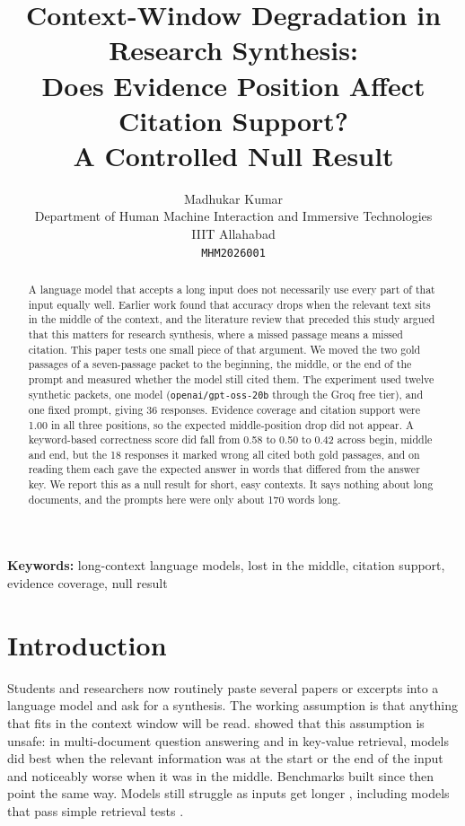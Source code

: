 \documentclass[11pt,a4paper]{article}
\title{Context-Window Degradation in Research Synthesis:\\
Does Evidence Position Affect Citation Support?\\
A Controlled Null Result}
\author{
  Madhukar Kumar\\
  Department of Human Machine Interaction and Immersive Technologies\\
  IIIT Allahabad\\
  \texttt{MHM2026001}
}
\date{}
\begin{document}
\maketitle

\begin{abstract}
A language model that accepts a long input does not necessarily use every part of that input equally well.
Earlier work found that accuracy drops when the relevant text sits in the middle of the context,
and the literature review that preceded this study argued that this matters for research synthesis, where a missed passage means a missed citation.
This paper tests one small piece of that argument.
We moved the two gold passages of a seven-passage packet to the beginning, the middle, or the end of the prompt
and measured whether the model still cited them.
The experiment used twelve synthetic packets, one model (\texttt{openai/gpt-oss-20b} through the Groq free tier),
and one fixed prompt, giving 36 responses.
Evidence coverage and citation support were 1.00 in all three positions, so the expected middle-position drop did not appear.
A keyword-based correctness score did fall from 0.58 to 0.50 to 0.42 across begin, middle and end,
but the 18 responses it marked wrong all cited both gold passages,
and on reading them each gave the expected answer in words that differed from the answer key.
We report this as a null result for short, easy contexts.
It says nothing about long documents, and the prompts here were only about 170 words long.
\end{abstract}

\noindent\textbf{Keywords:} long-context language models, lost in the middle, citation support, evidence coverage, null result

\section{Introduction}
\label{sec:intro}

Students and researchers now routinely paste several papers or excerpts into a language model and ask for a synthesis.
The working assumption is that anything that fits in the context window will be read.
\citet{liu2024lost} showed that this assumption is unsafe: in multi-document question answering and in key-value retrieval,
models did best when the relevant information was at the start or the end of the input and noticeably worse when it was in the middle.
Benchmarks built since then point the same way.
Models still struggle as inputs get longer \citep{bai2024longbench},
including models that pass simple retrieval tests \citep{hsieh2024ruler}.
\end{document}
